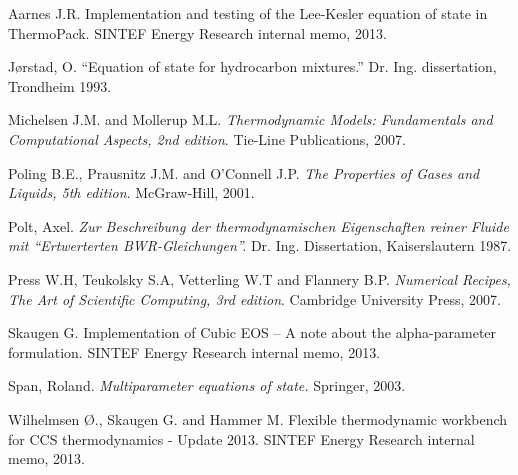 \documentclass[internal,english]{sintefmemo2012}
\numberwithin{equation}{section}
\begin{document}
\begin{thebibliography}{11}

 Aarnes J.R. Implementation and testing of the
  Lee-Kesler equation of state in ThermoPack. SINTEF Energy Research
  internal memo, 2013.

 Jørstad, O. ``Equation of state for hydrocarbon
  mixtures.'' Dr. Ing. dissertation, Trondheim 1993.

 Michelsen J.M. and Mollerup
  M.L. \textit{Thermodynamic Models: Fundamentals and Computational
    Aspects, 2nd edition}. Tie-Line Publications, 2007.

 Poling B.E., Prausnitz J.M. and O'Connell
  J.P. \textit{The Properties of Gases and Liquids, 5th
    edition}. McGraw-Hill, 2001.

 Polt, Axel. \textit{Zur Beschreibung der
    thermodynamischen Eigenschaften reiner Fluide mit ``Ertwerterten
    BWR-Gleichungen''.} Dr. Ing. Dissertation, Kaiserslautern
  1987. %

 Press W.H, Teukolsky S.A, Vetterling W.T and
  Flannery B.P. \textit{Numerical Recipes, The Art of Scientific
    Computing, 3rd edition}. Cambridge University Press, 2007.

 Skaugen G. Implementation of Cubic EOS -- A note
  about the alpha-parameter formulation. SINTEF Energy Research
  internal memo, 2013.

 Span, Roland. \textit{Multiparameter equations of
    state.} Springer, 2003.

 Wilhelmsen Ø., Skaugen G. and Hammer
  M. Flexible thermodynamic workbench for CCS thermodynamics - Update
  2013. SINTEF Energy Research internal memo, 2013.

\end{thebibliography}
\end{document}
